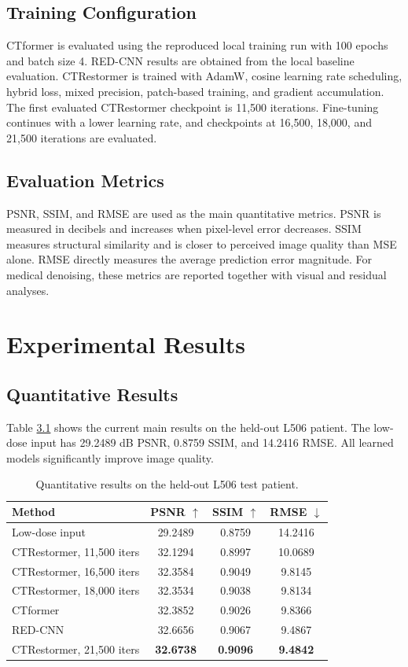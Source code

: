 \documentclass[12pt,a4paper]{report}
\begin{document}
\section{Training Configuration}

CTformer is evaluated using the reproduced local training run with 100 epochs and batch size 4. RED-CNN results are obtained from the local baseline evaluation. CTRestormer is trained with AdamW, cosine learning rate scheduling, hybrid loss, mixed precision, patch-based training, and gradient accumulation. The first evaluated CTRestormer checkpoint is 11,500 iterations. Fine-tuning continues with a lower learning rate, and checkpoints at 16,500, 18,000, and 21,500 iterations are evaluated.

\section{Evaluation Metrics}

PSNR, SSIM, and RMSE are used as the main quantitative metrics. PSNR is measured in decibels and increases when pixel-level error decreases. SSIM measures structural similarity and is closer to perceived image quality than MSE alone. RMSE directly measures the average prediction error magnitude. For medical denoising, these metrics are reported together with visual and residual analyses.

\chapter{Experimental Results}

\section{Quantitative Results}

Table \ref{tab:main_metrics} shows the current main results on the held-out L506 patient. The low-dose input has 29.2489 dB PSNR, 0.8759 SSIM, and 14.2416 RMSE. All learned models significantly improve image quality.

\begin{table}[htbp]
\centering
\caption{Quantitative results on the held-out L506 test patient.}
\label{tab:main_metrics}
\begin{tabular}{lccc}
\toprule
Method & PSNR \(\uparrow\) & SSIM \(\uparrow\) & RMSE \(\downarrow\) \\
\midrule
Low-dose input & 29.2489 & 0.8759 & 14.2416 \\
CTRestormer, 11,500 iters & 32.1294 & 0.8997 & 10.0689 \\
CTRestormer, 16,500 iters & 32.3584 & 0.9049 & 9.8145 \\
CTRestormer, 18,000 iters & 32.3534 & 0.9038 & 9.8134 \\
CTformer & 32.3852 & 0.9026 & 9.8366 \\
RED-CNN & 32.6656 & 0.9067 & 9.4867 \\
CTRestormer, 21,500 iters & \textbf{32.6738} & \textbf{0.9096} & \textbf{9.4842} \\
\bottomrule
\end{tabular}
\end{table}
\end{document}
